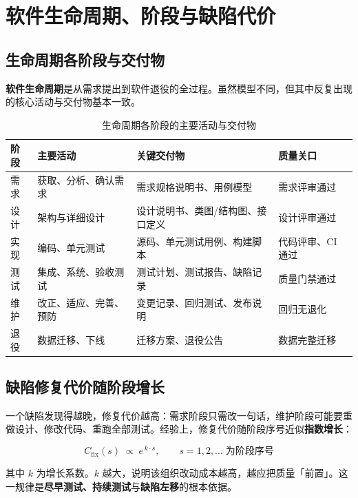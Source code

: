 \section{软件生命周期、阶段与缺陷代价}

\subsection{生命周期各阶段与交付物}

\textbf{软件生命周期}是从需求提出到软件退役的全过程。虽然模型不同，但其中反复出现的核心活动与交付物基本一致。

\begin{table}[H]
\centering
\caption{生命周期各阶段的主要活动与交付物}
\begin{tabulary}{\textwidth}{LLLL}
\toprule
阶段 & 主要活动 & 关键交付物 & 质量关口 \\
\midrule
需求 & 获取、分析、确认需求 & 需求规格说明书、用例模型 & 需求评审通过 \\
设计 & 架构与详细设计 & 设计说明书、类图/结构图、接口定义 & 设计评审通过 \\
实现 & 编码、单元测试 & 源码、单元测试用例、构建脚本 & 代码评审、CI 通过 \\
测试 & 集成、系统、验收测试 & 测试计划、测试报告、缺陷记录 & 质量门禁通过 \\
维护 & 改正、适应、完善、预防 & 变更记录、回归测试、发布说明 & 回归无退化 \\
退役 & 数据迁移、下线 & 迁移方案、退役公告 & 数据完整迁移 \\
\bottomrule
\end{tabulary}
\end{table}

\subsection{缺陷修复代价随阶段增长}

一个缺陷发现得越晚，修复代价越高：需求阶段只需改一句话，维护阶段可能要重做设计、修改代码、重跑全部测试。经验上，修复代价随阶段序号近似\textbf{指数增长}：

\begin{equation}
    C_{\text{fix}}(s) \;\propto\; e^{\,k\cdot s}, \qquad s = 1,2,\dots \;\text{为阶段序号}
\end{equation}

其中 $k$ 为增长系数。$k$ 越大，说明该组织改动成本越高，越应把质量「前置」。这一规律是\textbf{尽早测试、持续测试}与\textbf{缺陷左移}的根本依据。

